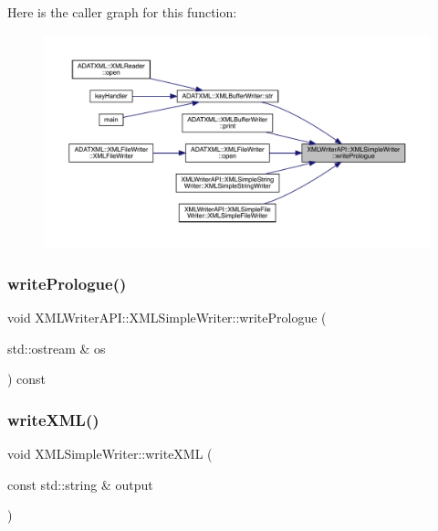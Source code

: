 Here is the caller graph for this function\+:\nopagebreak
\begin{figure}[H]
\begin{center}
\leavevmode
\includegraphics[width=350pt]{d5/de1/classXMLWriterAPI_1_1XMLSimpleWriter_a09f9ed556d1da6657529363bcee2c61c_icgraph}
\end{center}
\end{figure}
\mbox{\label{classXMLWriterAPI_1_1XMLSimpleWriter_a1f44b3dd9970ce14e8a4fcf026226028}} 
\subsubsection{\texorpdfstring{writePrologue()}{writePrologue()}\hspace{0.1cm}{\footnotesize\ttfamily [2/2]}}
{\footnotesize\ttfamily void X\+M\+L\+Writer\+A\+P\+I\+::\+X\+M\+L\+Simple\+Writer\+::write\+Prologue (\begin{DoxyParamCaption}\item[{std\+::ostream \&}]{os }\end{DoxyParamCaption}) const\hspace{0.3cm}{\ttfamily [protected]}}

\mbox{\label{classXMLWriterAPI_1_1XMLSimpleWriter_af4378ccb1442a3176f4548970f328537}} 
\subsubsection{\texorpdfstring{writeXML()}{writeXML()}\hspace{0.1cm}{\footnotesize\ttfamily [1/2]}}
{\footnotesize\ttfamily void X\+M\+L\+Simple\+Writer\+::write\+X\+ML (\begin{DoxyParamCaption}\item[{const std\+::string \&}]{output }\end{DoxyParamCaption})}

